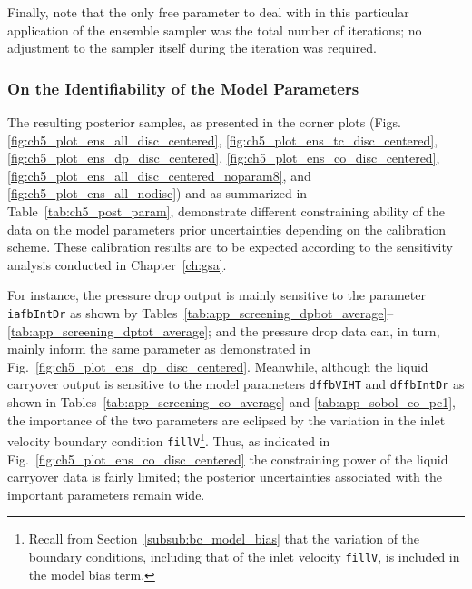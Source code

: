 Finally, note that the only free parameter to deal with in this particular application of the ensemble sampler was the total number of iterations; no adjustment to the sampler itself during the iteration was required.

\subsubsection{On the Identifiability of the Model Parameters}\label{subsub:bc_discussion_identifiability}

The resulting posterior samples, as presented in the corner plots (Figs. \ref{fig:ch5_plot_ens_all_disc_centered}, \ref{fig:ch5_plot_ens_tc_disc_centered}, \ref{fig:ch5_plot_ens_dp_disc_centered}, \ref{fig:ch5_plot_ens_co_disc_centered}, \ref{fig:ch5_plot_ens_all_disc_centered_noparam8}, and \ref{fig:ch5_plot_ens_all_nodisc}) and as summarized in Table~\ref{tab:ch5_post_param}, demonstrate different constraining ability of the data on the model parameters prior uncertainties depending on the calibration scheme.
These calibration results are to be expected according to the sensitivity analysis conducted in Chapter~\ref{ch:gsa}.

For instance, the pressure drop output is mainly sensitive to the parameter \texttt{iafbIntDr} as shown by Tables~\ref{tab:app_screening_dpbot_average}--\ref{tab:app_screening_dptot_average};
and the pressure drop data can, in turn, mainly inform the same parameter as demonstrated in Fig.~\ref{fig:ch5_plot_ens_dp_disc_centered}.
Meanwhile, although the liquid carryover output is sensitive to the model parameters \texttt{dffbVIHT} and \texttt{dffbIntDr} as shown in Tables~\ref{tab:app_screening_co_average} and \ref{tab:app_sobol_co_pc1},
the importance of the two parameters are eclipsed by the variation in the inlet velocity boundary condition \texttt{fillV}\footnote{Recall from Section~\ref{subsub:bc_model_bias} that the variation of the boundary conditions, including that of the inlet velocity \texttt{fillV}, is included in the model bias term.}.
Thus, as indicated in Fig.~\ref{fig:ch5_plot_ens_co_disc_centered} the constraining power of the liquid carryover data is fairly limited; the posterior uncertainties associated with the important parameters remain wide.

